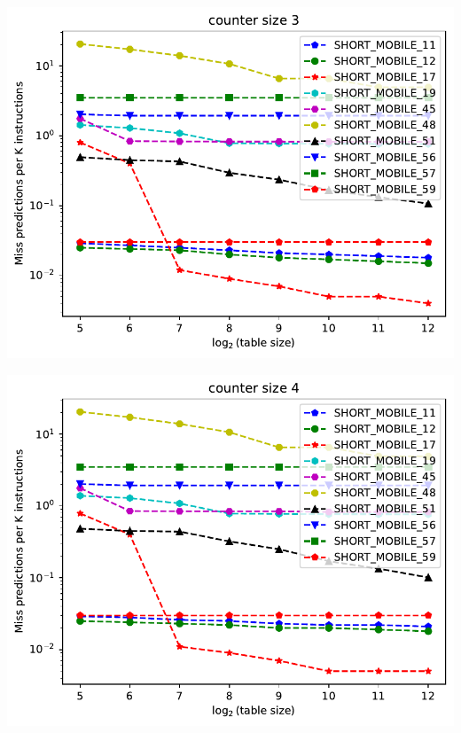 \documentclass[a4paper]{article}
\begin{document}
\begin{minipage}{.48\linewidth}
\includegraphics[width=\linewidth]{default-predictor/graph_3}
\end{minipage}%
\hfill
\begin{minipage}{.48\linewidth}
\includegraphics[width=\linewidth]{default-predictor/graph_4}
\end{minipage}
\end{document}
